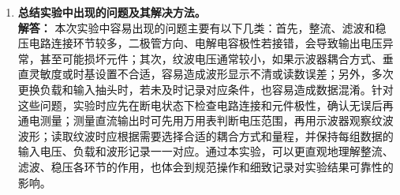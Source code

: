 \documentclass[10.5pt]{config}
\begin{document}
\begin{enumerate}[label=\arabic*., leftmargin=2em]
    \item \textbf{总结实验中出现的问题及其解决方法。}
    \\ \textbf{解答：}
    本次实验中容易出现的问题主要有以下几类：首先，整流、滤波和稳压电路连接环节较多，二极管方向、电解电容极性若接错，会导致输出电压异常，甚至可能损坏元件；其次，纹波电压通常较小，如果示波器耦合方式、垂直灵敏度或时基设置不合适，容易造成波形显示不清或读数误差；另外，多次更换负载和输入抽头时，若未及时记录对应条件，也容易造成数据混淆。针对这些问题，实验时应先在断电状态下检查电路连接和元件极性，确认无误后再通电测量；测量直流输出时可先用万用表判断电压范围，再用示波器观察纹波波形；读取纹波时应根据需要选择合适的耦合方式和量程，并保持每组数据的输入电压、负载和波形记录一一对应。通过本实验，可以更直观地理解整流、滤波、稳压各环节的作用，也体会到规范操作和细致记录对实验结果可靠性的影响。
\end{enumerate}
\end{document}
